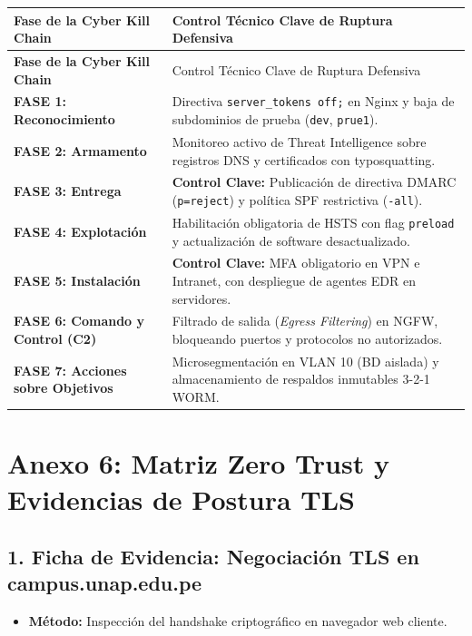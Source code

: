 \begin{center}
\small
\setlength{\tabcolsep}{4pt}
\renewcommand{\arraystretch}{1.2}
\begin{longtable}{>{\bfseries}p{4.2cm} p{10.2cm}}
\toprule
\rowcolor{outermarginbgcolor}
Fase de la Cyber Kill Chain & Control Técnico Clave de Ruptura Defensiva \\
\midrule
\endfirsthead
\toprule
\rowcolor{outermarginbgcolor}
Fase de la Cyber Kill Chain & Control Técnico Clave de Ruptura Defensiva \\
\midrule
\endhead
\bottomrule
\endfoot
FASE 1: Reconocimiento & Directiva \texttt{server\_tokens off;} en Nginx y baja de subdominios de prueba (\texttt{dev}, \texttt{prue1}). \\
\midrule
FASE 2: Armamento & Monitoreo activo de Threat Intelligence sobre registros DNS y certificados con typosquatting. \\
\midrule
FASE 3: Entrega & \textbf{Control Clave:} Publicación de directiva DMARC (\texttt{p=reject}) y política SPF restrictiva (\texttt{-all}). \\
\midrule
FASE 4: Explotación & Habilitación obligatoria de HSTS con flag \texttt{preload} y actualización de software desactualizado. \\
\midrule
FASE 5: Instalación & \textbf{Control Clave:} MFA obligatorio en VPN e Intranet, con despliegue de agentes EDR en servidores. \\
\midrule
FASE 6: Comando y Control (C2) & Filtrado de salida (\textit{Egress Filtering}) en NGFW, bloqueando puertos y protocolos no autorizados. \\
\midrule
FASE 7: Acciones sobre Objetivos & Microsegmentación en VLAN 10 (BD aislada) y almacenamiento de respaldos inmutables 3-2-1 WORM. \\
\bottomrule
\end{longtable}
\end{center}

\vspace{0.4cm}
\section*{Anexo 6: Matriz Zero Trust y Evidencias de Postura TLS}

\subsection*{1. Ficha de Evidencia: Negociación TLS en campus.unap.edu.pe}
\begin{itemize}[leftmargin=1.5em, itemsep=2pt]
    \item \textbf{Método:} Inspección del handshake criptográfico en navegador web cliente.
\end{itemize}

